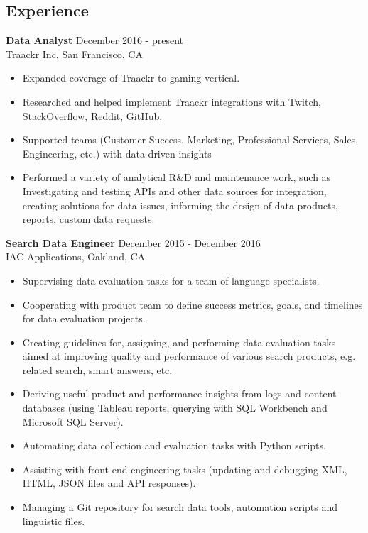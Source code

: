 \documentclass[10pt,line,letterpaper]{res}
\begin{document}
\address{968 Washington St Apt 4, San Francisco, CA}
\address{mulenoksv@gmail.com or (415)-359-3454}

\begin{resume}
\pagestyle{empty}
\section{Experience}
    {\bf Data Analyst} \hfill December 2016 - present\\
    Traackr Inc, San Francisco, CA
    \begin{itemize} \itemsep -2pt
    \item Expanded coverage of Traackr to gaming vertical. 
    \item Researched and helped implement Traackr integrations with Twitch, StackOverflow, Reddit, GitHub.
    \item Supported teams (Customer Success, Marketing, Professional Services, Sales, Engineering, etc.) with data-driven insights
    \item Performed a variety of analytical R&D and maintenance work, such as Investigating and testing APIs and other data sources for integration, creating solutions for data issues, informing the design of data products, reports, custom data requests.
    \end{itemize}

    {\bf Search Data Engineer} \hfill December 2015 - December 2016 \\
    IAC Applications, Oakland, CA
    \begin{itemize} \itemsep -2pt
    \item Supervising data evaluation tasks for a team of language specialists.
    \item Cooperating with product team to define success metrics, goals, and timelines for data evaluation projects.
    \item Creating guidelines for, assigning, and performing data evaluation tasks aimed at improving quality and performance of various search products, e.g. related search, smart answers, etc.
    \item Deriving useful product and performance insights from logs and content databases (using Tableau reports, querying with SQL Workbench and Microsoft SQL Server).
    \item Automating data collection and evaluation tasks with Python scripts.
    \item Assisting with front-end engineering tasks (updating and debugging XML, HTML, JSON files and API responses).
    \item Managing a Git repository for search data tools, automation scripts and linguistic files.
    \end{itemize}
    

\end{resume}
\end{document}
